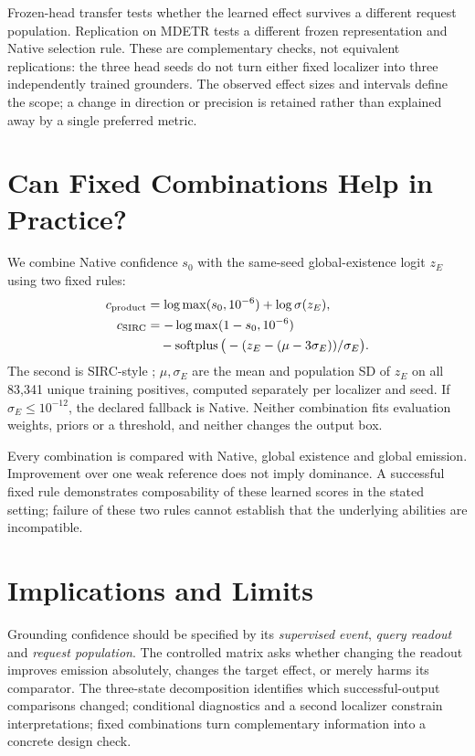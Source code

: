 \documentclass[10pt,twocolumn,letterpaper]{article}
\begin{document}
Frozen-head transfer tests whether the learned effect survives a
different request population. Replication on MDETR tests a different
frozen representation and Native selection rule. These are complementary
checks, not equivalent replications: the three head seeds do not turn
either fixed localizer into three independently trained grounders.
The observed effect sizes and intervals define the scope; a change in
direction or precision is retained rather than explained away by a
single preferred metric.

\section{Can Fixed Combinations Help in Practice?}

We combine Native confidence $s_0$ with the same-seed global-existence
logit $z_E$ using two fixed rules:
\begin{align}
c_{\rm product}&=\log\max(s_0,10^{-6})+\log\sigma(z_E),\\
c_{\rm SIRC}&=-\log\max(1-s_0,10^{-6})\nonumber\\
&\quad-\operatorname{softplus}\big(-(z_E-(\mu-3\sigma_E))/\sigma_E\big).
\end{align}
The second is SIRC-style \cite{xia2024sirc}; $\mu,\sigma_E$ are the
mean and population SD of $z_E$ on all 83,341 unique training positives,
computed separately per localizer and seed. If $\sigma_E\le10^{-12}$,
the declared fallback is Native. Neither combination fits evaluation
weights, priors or a threshold, and neither changes the output box.



Every combination is compared with Native, global existence and global
emission. Improvement over one weak reference does not imply dominance.
A successful fixed rule demonstrates composability of these learned
scores in the stated setting; failure of these two rules cannot
establish that the underlying abilities are incompatible.

\section{Implications and Limits}
Grounding confidence should be specified by its \emph{supervised event},
\emph{query readout} and \emph{request population}. The controlled
matrix asks whether changing the readout improves emission absolutely,
changes the target effect, or merely harms its comparator.
The three-state decomposition identifies which successful-output
comparisons changed; conditional diagnostics and a second localizer
constrain interpretations; fixed combinations turn complementary
information into a concrete design check.
\end{document}
